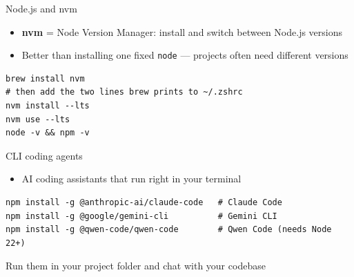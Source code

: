 \begin{frame}[fragile]{Node.js and nvm}
	\begin{itemize}
		\item \textbf{nvm} = Node Version Manager: install and switch between Node.js versions
		\item Better than installing one fixed \texttt{node} — projects often need different versions
	\end{itemize}

	\begin{verbatim}
brew install nvm
# then add the two lines brew prints to ~/.zshrc
nvm install --lts
nvm use --lts
node -v && npm -v
	\end{verbatim}
\end{frame}

\begin{frame}[fragile]{CLI coding agents}
	\begin{itemize}
		\item AI coding assistants that run right in your terminal
	\end{itemize}

	\begin{verbatim}
npm install -g @anthropic-ai/claude-code   # Claude Code
npm install -g @google/gemini-cli          # Gemini CLI
npm install -g @qwen-code/qwen-code        # Qwen Code (needs Node 22+)
	\end{verbatim}

	Run them in your project folder and chat with your codebase
\end{frame}
